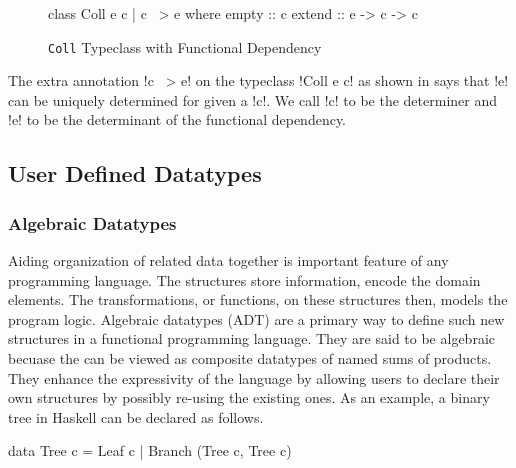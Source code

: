 \documentclass[manuscript,screen,nonacm]{acmart}
\begin{document}
\begin{figure}[ht]
  \begin{CenteredBox}
    \begin{code}
      class Coll e c | c ~> e where
      empty :: c
      extend :: e -> c -> c
    \end{code}
  \end{CenteredBox}
  \caption[Coll typeclass]{\lstinline{Coll} Typeclass with Functional Dependency}
  \label{fig:tc-collection-fd}
\end{figure}

The extra annotation !c ~> e! on the typeclass !Coll e c! as shown in  says that !e! can be uniquely determined for given a !c!.
We call !c! to be the determiner and !e! to be the determinant of the functional dependency.

%


\subsection{User Defined Datatypes}
\subsubsection{Algebraic Datatypes}
Aiding organization of related data together is important feature of any programming language. The structures store information, encode the domain elements. The transformations, or functions, on these structures then, models the program logic. Algebraic datatypes (ADT) are a primary way to define such new structures in a functional programming language. They are said to be algebraic becuase the can be viewed as composite datatypes of named sums of products. They enhance the expressivity of the language by allowing users to declare their own structures by possibly re-using the existing ones. As an example, a binary tree in Haskell can be declared as follows.

\begin{CenteredBox}
\begin{code}
data Tree c = Leaf c
            | Branch (Tree c, Tree c)
\end{code}
\end{CenteredBox}
\end{document}

